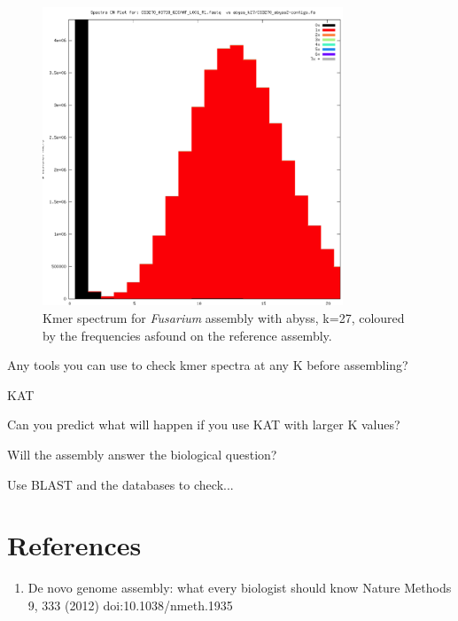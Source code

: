 \begin{figure}[H]
\centering
\includegraphics[width=0.8\textwidth]{handout/abyss-k27.png}
\caption{Kmer spectrum for \textit{Fusarium} assembly with abyss, k=27, coloured by the frequencies asfound on the reference assembly.}
\label{fig:fusariumk27}
\end{figure}

\begin{questions}
Any tools you can use to check kmer spectra at any K before assembling? \\
\begin{answer}
KAT \\
\end{answer}
Can you predict what will happen if you use KAT with larger K values? \\
\begin{answer}
\end{answer}
\end{questions}

\begin{steps}
Will the assembly answer the biological question?

Use BLAST and the databases to check...
\end{steps}

\section{References}
\begin{enumerate}
  \item De novo genome assembly: what every biologist should know Nature Methods 9, 333 (2012) doi:10.1038/nmeth.1935 
\end{enumerate}
